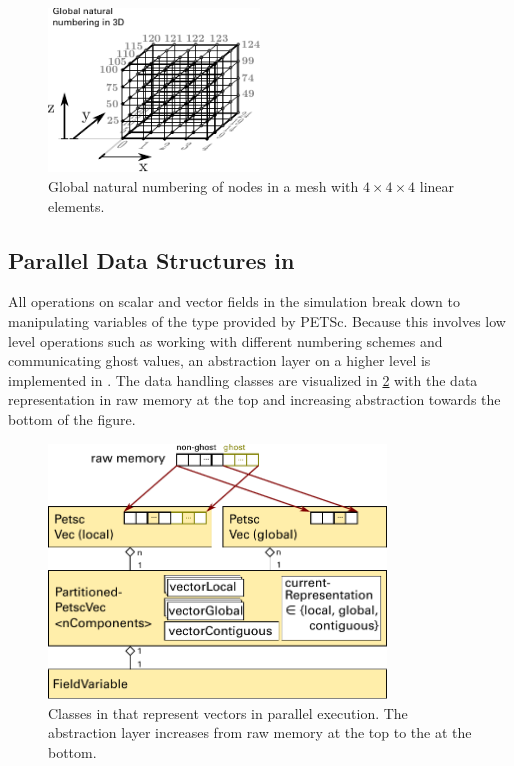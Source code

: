 \begin{figure}%
  \centering%
  \includegraphics[width=0.5\textwidth]{images/implementation/dof_numbering_global_3D.pdf}%
  \caption{Global natural numbering of nodes in a mesh with $4 \times 4 \times 4$ linear elements.}%
  \label{fig:dof_numbering_global_3D}%
\end{figure}%

\subsection{Parallel Data Structures in \Opendihu{}}\label{sec:paralel_data_structures_in_opendihu}

All operations on scalar and vector fields in the simulation break down to manipulating variables of the \Vec{} type provided by PETSc. 
Because this involves low level operations such as working with different numbering schemes and communicating ghost values, an abstraction layer on a higher level is implemented in \opendihu{}. The data handling classes are visualized in \cref{fig:partitioned_petsc_vec} with the data representation in raw memory at the top and increasing abstraction towards the bottom of the figure.

\begin{figure}%
  \centering%
  \includegraphics[width=0.8\textwidth]{images/implementation/partitioned_petsc_vec.pdf}%
  \caption{Classes in \opendihu{} that represent vectors in parallel execution. The abstraction layer increases from raw memory at the top to the  at the bottom.}%
  \label{fig:partitioned_petsc_vec}%
\end{figure}%

